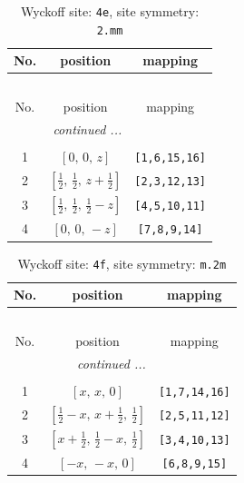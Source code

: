 \documentclass[fleqn,8pt]{jsarticle}
\begin{document}
\renewcommand{\arraystretch}{1.2}
\begin{longtable}{ccc}
\caption{Wyckoff site: {\tt 4e}, site symmetry: {\tt 2.mm}}
 \\
 \hline \hline
No. & position & mapping \\ \hline \endfirsthead

\multicolumn{2}{l}{\tablename\ \thetable{}} \\
 \hline \hline
No. & position & mapping \\ \hline \endhead

 \hline \hline
\multicolumn{2}{r}{\footnotesize\it continued ...} \\ \endfoot

 \hline \hline
\multicolumn{2}{r}{} \\ \endlastfoot

1 & $\left[ 0,\, 0,\, z \right]$ & {\tt [1,6,15,16]} \\ \hline
2 & $\left[ \frac{1}{2},\, \frac{1}{2},\, z + \frac{1}{2} \right]$ & {\tt [2,3,12,13]} \\ \hline
3 & $\left[ \frac{1}{2},\, \frac{1}{2},\, \frac{1}{2} - z \right]$ & {\tt [4,5,10,11]} \\ \hline
4 & $\left[ 0,\, 0,\, - z \right]$ & {\tt [7,8,9,14]} \\
\end{longtable}
\renewcommand{\arraystretch}{1.2}
\begin{longtable}{ccc}
\caption{Wyckoff site: {\tt 4f}, site symmetry: {\tt m.2m}}
 \\
 \hline \hline
No. & position & mapping \\ \hline \endfirsthead

\multicolumn{2}{l}{\tablename\ \thetable{}} \\
 \hline \hline
No. & position & mapping \\ \hline \endhead

 \hline \hline
\multicolumn{2}{r}{\footnotesize\it continued ...} \\ \endfoot

 \hline \hline
\multicolumn{2}{r}{} \\ \endlastfoot

1 & $\left[ x,\, x,\, 0 \right]$ & {\tt [1,7,14,16]} \\ \hline
2 & $\left[ \frac{1}{2} - x,\, x + \frac{1}{2},\, \frac{1}{2} \right]$ & {\tt [2,5,11,12]} \\ \hline
3 & $\left[ x + \frac{1}{2},\, \frac{1}{2} - x,\, \frac{1}{2} \right]$ & {\tt [3,4,10,13]} \\ \hline
4 & $\left[ - x,\, - x,\, 0 \right]$ & {\tt [6,8,9,15]} \\
\end{longtable}
\end{document}
